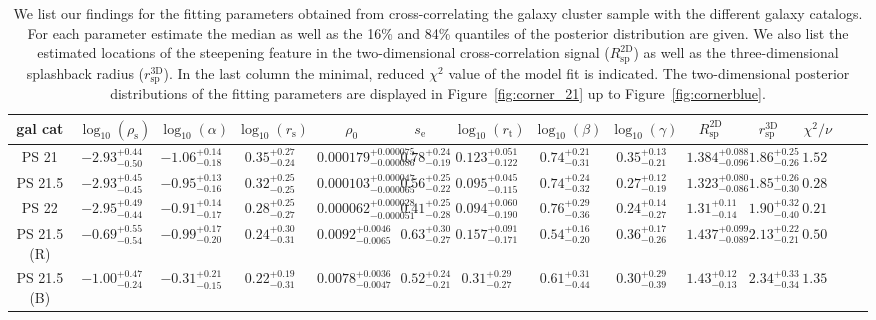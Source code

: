 \documentclass[iop, apjl, twocolappendix, numberedappendix]{emulateapj}
\begin{document}
\begin{table}
    \centering
    \caption{We list our findings for the fitting parameters obtained from cross-correlating the galaxy cluster sample with the different galaxy catalogs. For each parameter estimate the median as well as the 16\% and 84\% quantiles of the posterior distribution are given. We also list the estimated locations of the steepening feature in the two-dimensional cross-correlation signal ($R_{\mathrm{sp}}^{\mathrm{2D}}$) as well as the three-dimensional splashback radius ($r_{\mathrm{sp}}^{\mathrm{3D}}$). In the last column the minimal, reduced $\chi^2$ value of the model fit is indicated. The two-dimensional posterior distributions of the fitting parameters are displayed in 
Figure~\ref{fig:corner_21} up to Figure~\ref{fig:cornerblue}.}
    \label{tab:fit_parameters}
    \begin{tabular}{cccccccccccccc}
    \hline 
gal cat & $\log_{10}(\rho_{\mathrm{s}})$ & $\log_{10}(\alpha)$ & $\log_{10}(r_{\mathrm{s}})$ & $\rho_{\mathrm{0}}$ & $s_{\mathrm{e}}$ & $\log_{10}(r_{\mathrm{t}})$ & $\log_{10}(\beta)$ & $\log_{10}(\gamma)$ & $R_{\mathrm{sp}}^{\mathrm{2D}}$ & $r_{\mathrm{sp}}^{\mathrm{3D}}$ & $\chi^2/\nu$ \\
\hline 
\hline 
PS 21 & $-2.93_{-0.50}^{+0.44}$ & $-1.06_{-0.18}^{+0.14}$ & $0.35_{-0.24}^{+0.27}$ & $0.000179_{-0.000086}^{+0.000075}$ & $0.78_{-0.19}^{+0.24}$ & $0.123_{-0.122}^{+0.051}$ & $0.74_{-0.31}^{+0.21}$ & $0.35_{-0.21}^{+0.13}$ &$1.384_{-0.096}^{+0.088}$&$1.86_{-0.26}^{+0.25}$& $1.524$ \\
\hline
PS 21.5 & $-2.93_{-0.45}^{+0.45}$ & $-0.95_{-0.16}^{+0.13}$ & $0.32_{-0.25}^{+0.25}$ & $0.000103_{-0.000065}^{+0.000047}$ & $0.56_{-0.22}^{+0.25}$ & $0.095_{-0.115}^{+0.045}$ & $0.74_{-0.32}^{+0.24}$ & $0.27_{-0.19}^{+0.12}$ &$1.323_{-0.086}^{+0.080}$&$1.85_{-0.30}^{+0.26}$& $0.285$ \\
\hline
PS 22 & $-2.95_{-0.44}^{+0.49}$ & $-0.91_{-0.17}^{+0.14}$ & $0.28_{-0.27}^{+0.25}$ & $0.000062_{-0.000051}^{+0.000028}$ & $0.41_{-0.28}^{+0.25}$ & $0.094_{-0.190}^{+0.060}$ & $0.76_{-0.36}^{+0.29}$ & $0.24_{-0.27}^{+0.14}$ &$1.31_{-0.14}^{+0.11}$&$1.90_{-0.40}^{+0.32} $&$0.211$ \\
\hline
PS 21.5 (R) & $-0.69_{-0.54}^{+0.55}$ & $-0.99_{-0.20}^{+0.17}$ & $0.24_{-0.31}^{+0.30}$ & $0.0092_{-0.0065}^{+0.0046}$ & $0.63_{-0.27}^{+0.30}$ & $0.157_{-0.171}^{+0.091}$ & $0.54_{-0.20}^{+0.16}$ & $0.36_{-0.26}^{+0.17}$ & $1.437_{-0.089}^{+0.099}$ & $2.13_{-0.21}^{+0.22}$ & $0.502$ \\
\hline
PS 21.5 (B) & $-1.00_{-0.24}^{+0.47}$ & $-0.31_{-0.15}^{+0.21}$ & $0.22_{-0.31}^{+0.19}$ & $0.0078_{-0.0047}^{+0.0036}$ & $0.52_{-0.21}^{+0.24}$ & $0.31_{-0.27}^{+0.29}$ & $0.61_{-0.44}^{+0.31}$ & $0.30_{-0.39}^{+0.29}$ & $1.43_{-0.13}^{+0.12}$ & $2.34_{-0.34}^{+0.33}$ & $1.355$ \\
\hline
    \end{tabular} 
\end{table}
\end{document}
